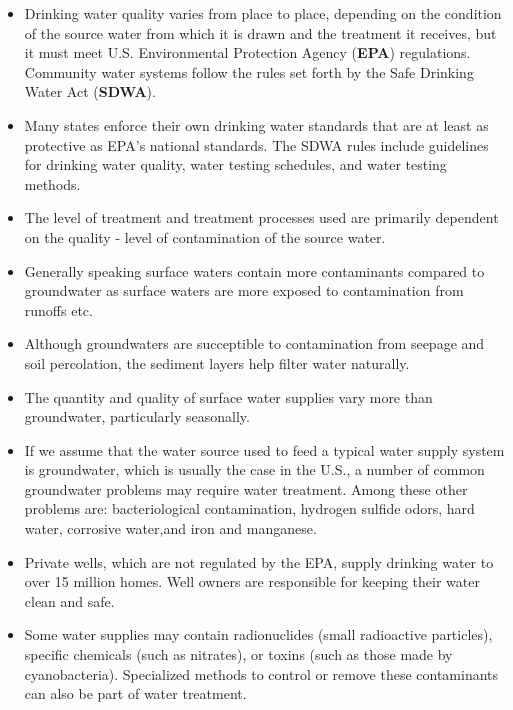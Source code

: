 \begin{itemize}
\item Drinking water quality varies from place to place, depending on the condition of the source water from which it is drawn and the treatment it receives, but it must meet U.S. Environmental Protection Agency (\textbf{EPA}) regulations. Community water systems follow the rules set forth by the Safe Drinking Water Act (\textbf{SDWA}).

\item Many states enforce their own drinking water standards that are at least as protective as EPA’s national standards. The SDWA rules include guidelines for drinking water quality, water testing schedules, and water testing methods.

\item The level of treatment and treatment processes used are primarily dependent on the quality - level of contamination of the source water.

\item Generally speaking surface waters contain more contaminants compared to groundwater as surface waters are more exposed to contamination from runoffs etc.  
\item Although groundwaters are succeptible to contamination from seepage and soil percolation, the sediment layers help filter water naturally. 

\item The quantity and quality of surface water supplies vary more than groundwater, particularly seasonally.

\item If we assume that the water source used to feed a typical water supply system is groundwater, which is usually the case in the U.S., a number of common groundwater problems may require water treatment. Among these other problems are: bacteriological contamination, hydrogen sulfide odors, hard water, corrosive water,and iron and manganese.

\item Private wells, which are not regulated by the EPA, supply drinking water to over 15 million homes. Well owners are responsible for keeping their water clean and safe.



\item Some water supplies may contain radionuclides (small radioactive particles), specific chemicals (such as nitrates), or toxins (such as those made by cyanobacteria). Specialized methods to control or remove these contaminants can also be part of water treatment.


\end{itemize}
